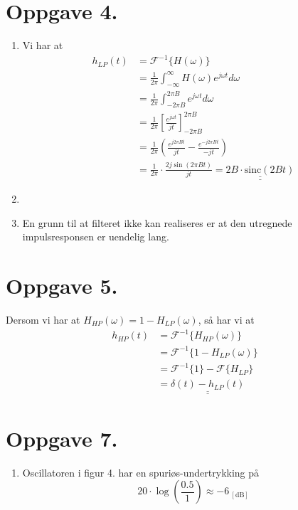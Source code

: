 \documentclass[a4paper,11pt,norsk]{article}
\begin{document}
\section*{Oppgave 4.}
\begin{enumerate}
    \item Vi har at 
        \begin{align*}
            h_{LP}(t) &= \mathscr{F}^{-1}\{H(\omega)\} \\
                      &= \frac{1}{2\pi} \int_{-\infty}^{\infty}{H(\omega) e^{j\omega t} d\omega} \\
                      &= \frac{1}{2\pi} \int_{-2\pi B}^{2\pi B}{e^{j\omega t} d\omega} \\
                      &= \frac{1}{2\pi} \left[\frac{e^{j\omega t}}{jt}\right]_{-2\pi B}^{2\pi B} \\
                      &= \frac{1}{2\pi} \left(\frac{e^{j 2\pi B t}}{jt} - \frac{e^{-j 2\pi B t}}{-jt}\right) \\
                      &= \frac{1}{2\pi} \cdot \frac{2j \sin(2\pi B t)}{jt} = \underline{\underline{2B \cdot \text{sinc}(2Bt)}}
        \end{align*}
    \item 
    \item En grunn til at filteret ikke kan realiseres er at den utregnede impulsresponsen er uendelig lang.
\end{enumerate}

\section*{Oppgave 5.}
Dersom vi har at $H_{HP}(\omega) = 1 - H_{LP}(\omega)$, så har vi at
\begin{align*}
    h_{HP}(t) &= \mathscr{F}^{-1}\{H_{HP}(\omega)\} \\
              &= \mathscr{F}^{-1}\{1 - H_{LP}(\omega)\} \\
              &= \mathscr{F}^{-1}\{1\} - \mathscr{F}\{H_{LP}\} \\
              &= \underline{\underline{\delta(t) - h_{LP}(t)}}
\end{align*}

\section*{Oppgave 7.}
\begin{enumerate}
    \item Oscillatoren i figur 4. har en spuriøs-undertrykking på
        \[
            20 \cdot \log\left(\frac{0.5}{1}\right) \approx -6_{\:[\text{dB}]}
        \]
\end{enumerate}
\end{document}
